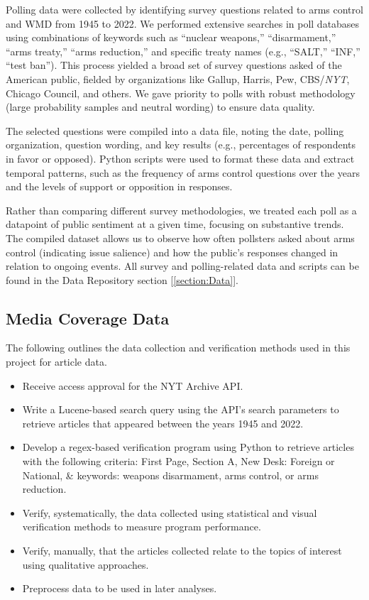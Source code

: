 \documentclass[11,5 pt]{article}
\begin{document}
    Polling data were collected by identifying survey questions related to arms control and WMD from 1945 to 2022. We performed extensive searches in poll databases using combinations of keywords such as “nuclear weapons,” “disarmament,” “arms treaty,” “arms reduction,” and specific treaty names (e.g., “SALT,” “INF,” “test ban”). This process yielded a broad set of survey questions asked of the American public, fielded by organizations like Gallup, Harris, Pew, CBS/\textit{NYT}, Chicago Council, and others. We gave priority to polls with robust methodology (large probability samples and neutral wording) to ensure data quality. 
    
    The selected questions were compiled into a data file, noting the date, polling organization, question wording, and key results (e.g., percentages of respondents in favor or opposed). Python scripts were used to format these data and extract temporal patterns, such as the frequency of arms control questions over the years and the levels of support or opposition in responses. 
    
    Rather than comparing different survey methodologies, we treated each poll as a datapoint of public sentiment at a given time, focusing on substantive trends. The compiled dataset allows us to observe how often pollsters asked about arms control (indicating issue salience) and how the public’s responses changed in relation to ongoing events. All survey and polling-related data and scripts can be found in the Data Repository section [\ref{section:Data}].


\subsection{Media Coverage Data}

    The following outlines the data collection and verification methods used in this project for article data.
    
    \begin{itemize}
        \item Receive access approval for the NYT Archive API.
        \item Write a Lucene-based search query using the API's search parameters to retrieve articles that appeared between the years 1945 and 2022.
        \item Develop a regex-based verification program using Python to retrieve articles with the following criteria: First Page, Section A, New Desk: Foreign or National, \& keywords: weapons disarmament, arms control, or arms reduction. \label{th:criteria}
        \item Verify, systematically, the data collected using statistical and visual verification methods to measure program performance.
        \item Verify, manually, that the articles collected relate to the topics of interest using qualitative approaches.
        \item Preprocess data to be used in later analyses. 
    \end{itemize}
    
\end{document}
